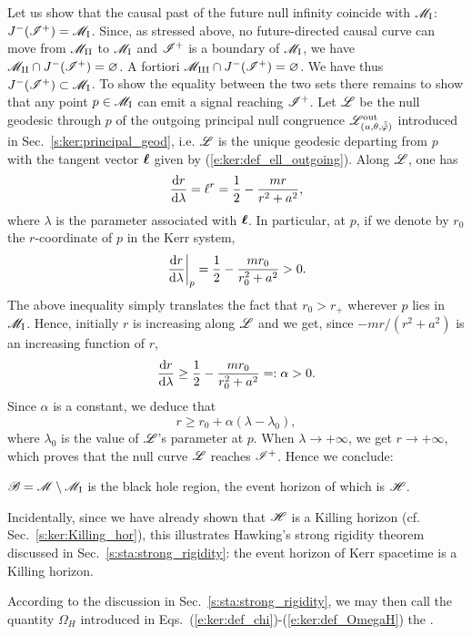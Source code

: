 Let us show that the causal past of the future null infinity
coincide with $\mathscr{M}_{\rm I}$: $J^{-}(\mathscr{I}^+)=\mathscr{M}_{\rm I}$.
Since, as stressed above, no future-directed causal curve can move from $\mathscr{M}_{\rm II}$ to $\mathscr{M}_{\rm I}$
and $\mathscr{I}^+$ is a boundary of $\mathscr{M}_{\rm I}$, we have $\mathscr{M}_{\rm II} \cap J^{-}(\mathscr{I}^+) = \varnothing$. A fortiori $\mathscr{M}_{\rm III} \cap J^{-}(\mathscr{I}^+) = \varnothing$.
We have thus $J^{-}(\mathscr{I}^+)\subset \mathscr{M}_{\rm I}$. To show the equality between the
two sets there remains to show
that any point $p\in \mathscr{M}_{\rm I}$ can emit a signal reaching $\mathscr{I}^+$.
Let $\mathscr{L}$ be the null geodesic through $p$ of the outgoing principal null
congruence $\mathscr{L}^{\rm out}_{(u,\theta,\tilde{{\tilde\varphi}})}$ introduced in Sec.~\ref{s:ker:principal_geod}, i.e. $\mathscr{L}$ is the unique geodesic departing
from $p$ with the tangent vector $\bm{\ell}$ given by
(\ref{e:ker:def_ell_outgoing}). Along $\mathscr{L}$, one has
\[
   \frac{\mathrm{d} r}{\mathrm{d}\lambda} = \ell^r = \frac{1}{2} - \frac{m r}{r^2 + a^2} ,
\]
where $\lambda$ is the parameter associated with $\bm{\ell}$.
In particular, at $p$, if we denote by $r_0$ the $r$-coordinate of $p$ in the Kerr system,
\[
    \left. \frac{\mathrm{d} r}{\mathrm{d}\lambda} \right| _{p} = \frac{1}{2} - \frac{m r_0}{r_0^2 + a^2} > 0 .
\]
The above inequality simply translates the fact that $r_0 > r_+$ wherever $p$ lies in
$\mathscr{M}_{\rm I}$.
Hence, initially $r$ is increasing along $\mathscr{L}$ and we get, since $-mr/(r^2+a^2)$ is an
increasing function of $r$,
\[
    \frac{\mathrm{d} r}{\mathrm{d}\lambda} \geq \frac{1}{2} - \frac{m r_0}{r_0^2 + a^2} =: \alpha > 0.
\]
Since $\alpha$ is a constant, we deduce that
\[
    r \geq r_0 + \alpha(\lambda - \lambda_0) ,
\]
where $\lambda_0$ is the value of $\mathscr{L}$'s parameter at $p$. When $\lambda\rightarrow +\infty$,
we get $r\rightarrow +\infty$, which proves that the null curve $\mathscr{L}$
reaches $\mathscr{I}^+$. Hence we conclude:
\begin{prop}
$\mathscr{B} = \mathscr{M} \setminus \mathscr{M}_{\rm I}$ is the black hole region, the event
horizon of which is $\mathscr{H}$.
\end{prop}
Incidentally, since we have already shown that $\mathscr{H}$ is a Killing horizon
(cf. Sec.~\ref{s:ker:Killing_hor}),
this illustrates Hawking's strong rigidity theorem discussed
in Sec.~\ref{s:sta:strong_rigidity}: the event horizon of Kerr spacetime
is a Killing horizon.

According to the discussion in Sec.~\ref{s:sta:strong_rigidity}, we may then
call the quantity $\Omega_H$ introduced in
Eqs.~(\ref{e:ker:def_chi})-(\ref{e:ker:def_OmegaH}) the
.

